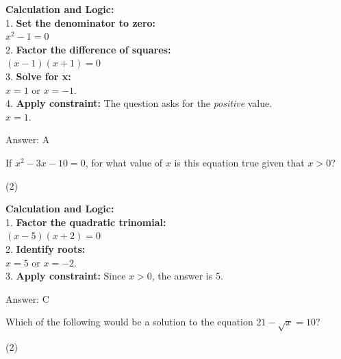 \documentclass[11pt,paper=a4,answers]{exam}
\begin{document}
\begin{questions}
\begin{solution}
\vspace{30pt}

\textbf{Calculation and Logic:} \\
1. \textbf{Set the denominator to zero:} \\
   $x^2 - 1 = 0$ \\
2. \textbf{Factor the difference of squares:} \\
   $(x - 1)(x + 1) = 0$ \\
3. \textbf{Solve for x:} \\
   $x = 1$ or $x = -1$. \\
4. \textbf{Apply constraint:} The question asks for the \textit{positive} value. \\
   $x = 1$.

\vspace{30pt}

Answer: \colorbox{yellow!100}{A}
\end{solution}

\vspace{60pt}

\question
If $x^2 - 3x - 10 = 0$, for what value of $x$ is this equation true given that $x > 0$?
\begin{tasks}(2)
\end{tasks}

\begin{solution}
\textbf{Calculation and Logic:} \\
1. \textbf{Factor the quadratic trinomial:} \\
   $(x - 5)(x + 2) = 0$ \\
2. \textbf{Identify roots:} \\
   $x = 5$ or $x = -2$. \\
3. \textbf{Apply constraint:} Since $x > 0$, the answer is 5.

\vspace{30pt}

Answer: \colorbox{yellow!100}{C}
\end{solution}

\vspace{60pt}

\question
Which of the following would be a solution to the equation $21 - \sqrt{x} = 10$?
\begin{tasks}(2)
\end{tasks}


\end{questions}
\end{document}
